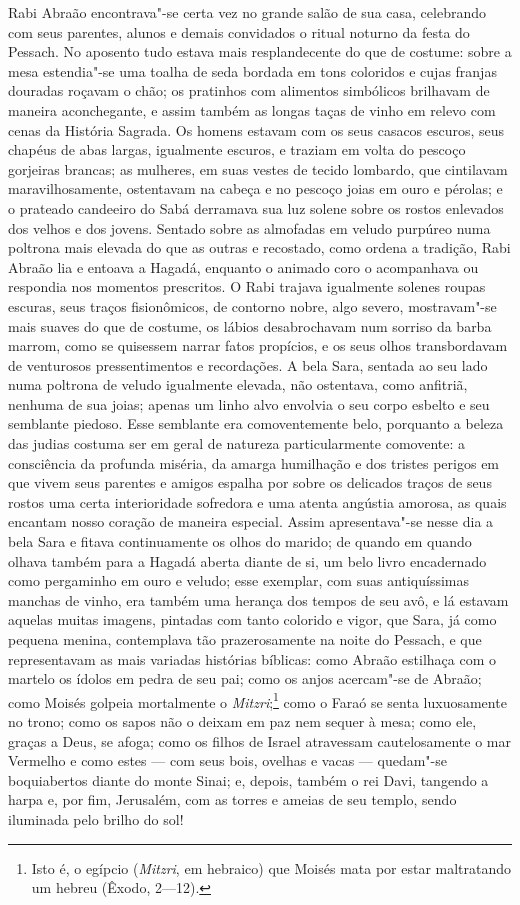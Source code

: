 Rabi Abraão encontrava"-se certa vez no grande salão de sua casa,
celebrando com seus parentes, alunos e demais convidados o ritual
noturno da festa do Pessach. No aposento tudo estava mais
resplandecente do que de costume: sobre a mesa estendia"-se uma toalha
de seda bordada em tons coloridos e cujas franjas douradas roçavam o
chão; os pratinhos com alimentos simbólicos brilhavam de maneira
aconchegante, e assim também as longas taças de vinho em relevo com
cenas da História Sagrada. Os homens estavam com os seus casacos
escuros, seus chapéus de abas largas, igualmente escuros, e traziam em
volta do pescoço gorjeiras brancas; as mulheres, em suas vestes de
tecido lombardo, que cintilavam maravilhosamente, ostentavam na cabeça
e no pescoço joias em ouro e pérolas; e o prateado candeeiro do Sabá
derramava sua luz solene sobre os rostos enlevados dos velhos e dos
jovens. Sentado sobre as almofadas em veludo purpúreo numa poltrona
mais elevada do que as outras e recostado, como ordena a tradição, Rabi
Abraão lia e entoava a Hagadá, enquanto o animado coro o acompanhava ou
respondia nos momentos prescritos. O Rabi trajava igualmente solenes
roupas escuras, seus traços fisionômicos, de contorno nobre, algo
severo, mostravam"-se mais suaves do que de costume, os lábios
desabrochavam num sorriso da barba marrom, como se quisessem narrar
fatos propícios, e os seus olhos transbordavam de venturosos
pressentimentos e recordações. A bela Sara, sentada ao seu lado numa
poltrona de veludo igualmente elevada, não ostentava, como anfitriã,
nenhuma de sua joias; apenas um linho alvo envolvia o seu corpo esbelto
e seu semblante piedoso. Esse semblante era comoventemente belo,
porquanto a beleza das judias costuma ser em geral de natureza
particularmente comovente: a consciência da profunda miséria, da amarga
humilhação e dos tristes perigos em que vivem seus parentes e amigos
espalha por sobre os delicados traços de seus rostos uma certa
interioridade sofredora e uma atenta angústia amorosa, as quais
encantam nosso coração de maneira especial. Assim apresentava"-se
nesse dia a bela Sara e fitava continuamente os olhos do marido; de
quando em quando olhava também para a Hagadá aberta diante de si, um
belo livro encadernado como pergaminho em ouro e veludo; esse exemplar,
com suas antiquíssimas manchas de vinho, era também uma herança dos
tempos de seu avô, e lá estavam aquelas muitas imagens, pintadas com
tanto colorido e vigor, que Sara, já como pequena menina, contemplava
tão prazerosamente na noite do Pessach, e que representavam as mais
variadas histórias bíblicas: como Abraão estilhaça com o martelo os
ídolos em pedra de seu pai; como os anjos acercam"-se de Abraão; como
Moisés golpeia mortalmente o
\textit{Mitzri};\footnote{
Isto é, o egípcio (\textit{Mitzri}, em hebraico) que Moisés mata por
estar maltratando um hebreu (Êxodo, 2---12).}
como o Faraó se senta luxuosamente no trono; como os sapos não o
deixam em paz nem sequer à mesa; como ele, graças a Deus, se afoga;
como os filhos de Israel atravessam cautelosamente o mar Vermelho e
como estes --- com seus bois, ovelhas e vacas --- quedam"-se boquiabertos
diante do monte Sinai; e, depois, também o rei Davi, tangendo a harpa
e, por fim, Jerusalém, com as torres e ameias de seu templo, sendo
iluminada pelo brilho do sol!

